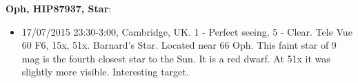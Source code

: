 {\bf Oph, HIP87937, Star}:
\begin{itemize}
\item 17/07/2015 23:30-3:00, Cambridge, UK. 1 - Perfect seeing, 5 - Clear. Tele Vue 60 F6, 15x, 51x. Barnard's Star. Located near 66 Oph. This faint star of 9 mag is the fourth closest star to the Sun. It is a red dwarf. At 51x it was slightly more visible. Interesting target.
\end{itemize}
